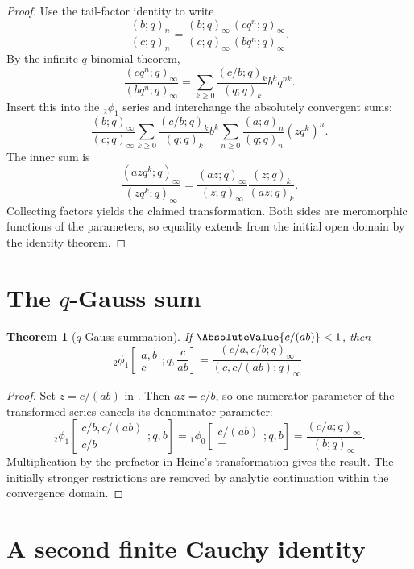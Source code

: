 \documentclass[11pt,a4paper,oneside,openany]{book}
\newtheorem{theorem}{Theorem}[chapter]
\theoremstyle{definition}
\theoremstyle{remark}
\begin{document}
\begin{proof}
Use the tail-factor identity to write
\[
 \frac{(b;q)_n}{(c;q)_n}
 =\frac{(b;q)_\infty}{(c;q)_\infty}
 \frac{(cq^n;q)_\infty}{(bq^n;q)_\infty}.
\]
By the infinite $q$-binomial theorem,
\[
 \frac{(cq^n;q)_\infty}{(bq^n;q)_\infty}
 =\sum_{k\ge0}\frac{(c/b;q)_k}{(q;q)_k}b^kq^{nk}.
\]
Insert this into the ${}_2\phi_1$ series and interchange the absolutely convergent sums:
\[
 \frac{(b;q)_\infty}{(c;q)_\infty}
 \sum_{k\ge0}\frac{(c/b;q)_k}{(q;q)_k}b^k
 \sum_{n\ge0}\frac{(a;q)_n}{(q;q)_n}(zq^k)^n.
\]
The inner sum is
\[
 \frac{(azq^k;q)_\infty}{(zq^k;q)_\infty}
 =\frac{(az;q)_\infty}{(z;q)_\infty}
 \frac{(z;q)_k}{(az;q)_k}.
\]
Collecting factors yields the claimed transformation.  Both sides are meromorphic functions of the parameters, so equality extends from the initial open domain by the identity theorem.
\end{proof}

\section{The \texorpdfstring{$q$}{q}-Gauss sum}

\begin{theorem}[$q$-Gauss summation]\label{thm:q-gauss}
If $\AbsoluteValue{c/(ab)}<1$, then
\[
 {}_2\phi_1\!\left[
 \begin{matrix}a,b\\c\end{matrix};q,\frac{c}{ab}\right]
 =\frac{(c/a,c/b;q)_\infty}{(c,c/(ab);q)_\infty}.
\]
\end{theorem}

\begin{proof}
Set $z=c/(ab)$ in .  Then $az=c/b$, so one numerator parameter of the transformed series cancels its denominator parameter:
\[
 {}_2\phi_1\!\left[\begin{matrix}c/b,c/(ab)\\c/b\end{matrix};q,b\right]
 ={}_1\phi_0\!\left[\begin{matrix}c/(ab)\\-\end{matrix};q,b\right]
 =\frac{(c/a;q)_\infty}{(b;q)_\infty}.
\]
Multiplication by the prefactor in Heine's transformation gives the result.  The initially stronger restrictions are removed by analytic continuation within the convergence domain.
\end{proof}

\section{A second finite Cauchy identity}
\end{document}
